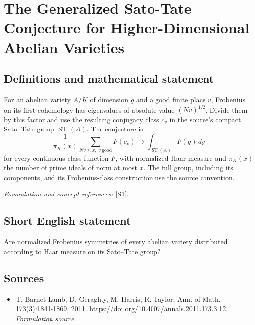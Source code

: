 \documentclass[11pt]{article}
\begin{document}
\section*{\texorpdfstring{The Generalized Sato-Tate Conjecture for Higher-Dimensional Abelian Varieties}{The Generalized Sato-Tate Conjecture for Higher-Dimensional Abelian Varieties}}\label{135}
\subsection{Definitions and mathematical statement}
For an abelian variety $A/K$ of dimension $g$ and a good finite place $v$, Frobenius on its first cohomology has eigenvalues of absolute value $(Nv)^{1/2}$. Divide them by this factor and use the resulting conjugacy class $c_v$ in the source's compact Sato--Tate group $\operatorname{ST}(A)$. The conjecture is
\[
 \frac1{\pi_K(x)}\sum_{Nv\le x,\ v\text{ good}}F(c_v)
 \longrightarrow\int_{\operatorname{ST}(A)}F(g)\,dg
\]
for every continuous class function $F$, with normalized Haar measure and $\pi_K(x)$ the number of prime ideals of norm at most $x$. The full group, including its components, and its Frobenius-class construction use the source convention.
\par\smallskip\textit{Formulation and concept references:} \href{https://doi.org/10.4007/annals.2011.173.3.12}{[S1]}.

\subsection{Short English statement}
Are normalized Frobenius symmetries of every abelian variety distributed according to Haar measure on its Sato--Tate group?
\subsection{Sources}
\begin{itemize}
\item[S1]T. Barnet-Lamb, D. Geraghty, M. Harris, R. Taylor, Ann. of Math. 173(3):1841-1869, 2011.
\url{https://doi.org/10.4007/annals.2011.173.3.12}.
\textit{Formulation source.}
\end{itemize}
\end{document}
